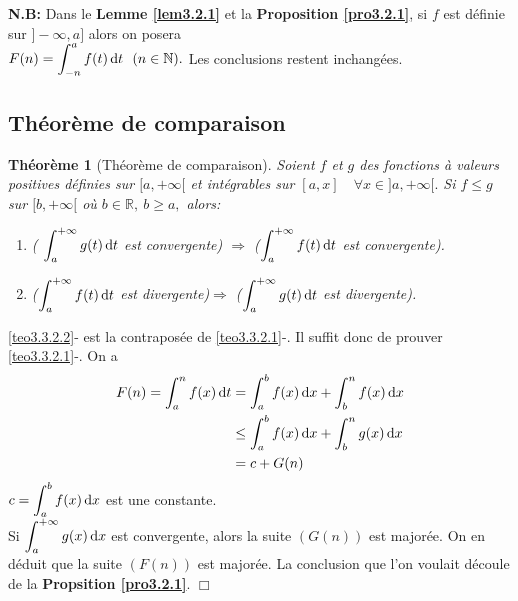 \documentclass[11pt, a4paper]{book}
\newtheorem{teo}{Th\'eor\`eme}[section]
\newenvironment{pr}{\noindent {\bf Preuve} \noindent} {\hfill $\Box$\vskip 5mm}
\begin{document}
\textbf{N.B:} Dans le \textbf{Lemme \ref{lem3.2.1}} et la \textbf{Proposition \ref{pro3.2.1}}, si $f$ est d\'efinie sur $]-\infty,a]$ alors on posera\\ ${\displaystyle F(n)=\int^a_{-n} f(t)\,\mathrm{d} t ~~ (n\in \mathbb{N}).}$ Les conclusions restent inchang\'ees.

\subsection{Th\'eor\`eme de comparaison}
\begin{teo}[Th\'eor\`eme de comparaison] \label{teo3.3.2} Soient $f$ et $g$ des fonctions \`a valeurs positives d\'efinies sur $[a,+\infty[$ et int\'egrables sur $[a,x]\quad\forall x\in ]a,+\infty[.$ Si $f\leq g$ sur $[b,+\infty[$ o\`u $b\in \mathbb{R},~b\geq a,$ alors: 
\begin{enumerate}
\item \label{teo3.3.2.1}( ${\displaystyle \int_a^{+\infty}g(t)\,\mathrm{d} t}$ est convergente) $\Longrightarrow$ ($ {\displaystyle \int_a^{+\infty}f(t)\,\mathrm{d} t}$ est convergente).
\item\label{teo3.3.2.2} (${\displaystyle \int_a^{+\infty}f(t)\,\mathrm{d} t}$ est divergente)$\Longrightarrow$ (${\displaystyle \int_a^{+\infty}g(t)\,\mathrm{d} t}$ est divergente).
\end{enumerate} \end{teo}
\begin{pr} \quad
\ref{teo3.3.2.2}- est la contrapos\'ee de \ref{teo3.3.2.1}-. Il suffit donc de prouver \ref{teo3.3.2.1}-. On a 
\begin{align*} F(n) = \int_a^n f(x)\,\mathrm{d} t&=\int_a^b f(x)\,\mathrm{d} x +\int_b^n f(x)\,\mathrm{d} x \\
&\leq \int_a^b f(x)\,\mathrm{d} x +\int_b^n g(x)\,\mathrm{d} x\\
&= c+ G(n) \end{align*}
${\displaystyle c= \int_a^b f(x)\,\mathrm{d} x}$ est une constante.\\
Si ${\displaystyle \int_a^{+\infty} g(x)\,\mathrm{d} x}$ est convergente, alors la suite $(G(n))$ est major\'ee. On en d\'eduit que la suite $(F(n))$ est major\'ee. La conclusion que l'on voulait d\'ecoule de la \textbf{Propsition \ref{pro3.2.1}}.
\end{pr}
\end{document}
